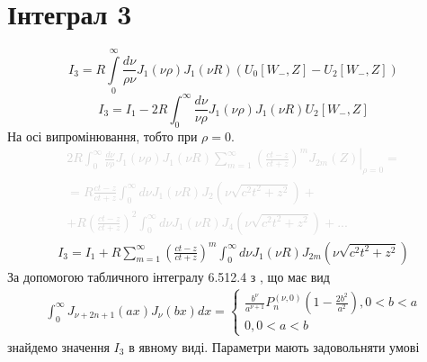 \section{Інтеграл 3}

\begin{equation}
I_3 = R \int \limits_{0}^{\infty} \frac{d \nu}{\rho \nu} 
J_1(\nu \rho) J_1(\nu R) (U_0[ W_-, Z ] - U_2[ W_-, Z ])
\end{equation}
%
\begin{equation} \label{eq:intergal3}
I_3 = I_1 - 2 R \int_{0}^{\infty} \frac{d \nu}{\nu \rho} 
J_1(\nu \rho) J_1(\nu R) U_2[ W_-, Z ]
\end{equation}
%
На осі випромінювання, тобто при $ \rho = 0 $. 
%
\textcolor{lightgray}{ \begin{equation*} \begin{aligned}
\left. 2 R \int_{0}^{\infty} \frac{d \nu}{\nu \rho} 
J_1(\nu \rho) J_1(\nu R) \sum_{m=1}^{\infty} \left( 
\frac{ct - z}{ct + z} \right)^m J_{2m} (Z) 
\right|_{\rho = 0} = \\ = R \frac{ct - z}{ct + z} \int_{0}^{\infty} 
d \nu J_1(\nu R) J_2 (\nu \sqrt{c^2t^2 + z^2}) + \\ 
+ R \left( \frac{ct - z}{ct + z} \right)^2 
\int_{0}^{\infty} d \nu J_1(\nu R) J_4 (\nu \sqrt{c^2t^2 + z^2}) + ...
\end{aligned} \end{equation*} }
%
\begin{equation} \begin{aligned} \label{eq:i3_pol_int}
I_3 = I_1 + R \sum_{m=1}^{\infty} \left( \frac{ct - z}{ct + z} \right)^m 
\int_{0}^{\infty} d \nu J_1(\nu R) J_{2m} (\nu \sqrt{c^2t^2 + z^2})
\end{aligned} \end{equation}
%
За допомогою табличного інтегралу 6.512.4 з 
\cite[ст. 681]{imp:GradshtejnInt}, що має вид
%
\begin{equation*} \begin{aligned}
\int_0^\infty J_{\nu+2n+1} (ax) J_\nu (bx) dx = 
\begin{cases} \frac{b^\nu}{a^{\nu+1}}
P_n^{(\nu,0)} \left( 1 - \frac{2b^2}{a^2} \right) , 0 < b < a \\
0, 0 < a < b \end{cases}
\end{aligned} \end{equation*}
%
знайдемо значення $ I_3 $ в явному виді. Параметри мають задовольняти умові  
